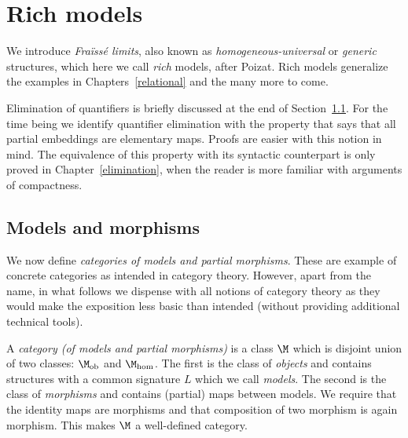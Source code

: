 \chapter{Rich models}
\label{fraisse} 

\def\ceq#1#2#3{\parbox[b]{20ex}{$\displaystyle #1$}\parbox[b]{4ex}{\hfil$#2$}$\displaystyle #3$}

We introduce \textit{Fra\"iss\'e limits}, also known as \textit{homogeneous-universal\/} or \textit{generic\/} structures, which here we call \textit{rich\/} models, after Poizat.
Rich models generalize the examples in Chapters~\ref{relational} and the many more to come.

Elimination of quantifiers is briefly discussed at the end of Section~\ref{rich}.
For the time being we identify  quantifier elimination with the property that says that all partial embeddings are elementary maps.
Proofs are easier with this notion in mind.
The equivalence of this property with its syntactic counterpart is only proved in Chapter~\ref{elimination}, when the reader is more familiar with arguments of compactness.

\section{Models and morphisms}\label{rich}
We now define \textit{categories of models and partial morphisms}.
These are example of concrete categories as intended in category theory.
However, apart from the name, in what follows we dispense with all notions of category theory as they would make the exposition less basic than intended (without providing additional technical tools).



A \emph{category (of models and partial morphisms)\/} is a class $\M$ which is disjoint union of two classes: \emph{$\M_{\textrm{ob}}$} and \emph{$\M_{\textrm{hom}}$}.
The first is the class of \emph{objects\/} and contains structures with a common signature $L$ which we call \emph{models}.
The second is the class of \emph{morphisms\/} and contains (partial) maps between models.
We require that the identity maps are morphisms and that composition of two morphism is again morphism.
This makes $\M$ a well-defined category.


